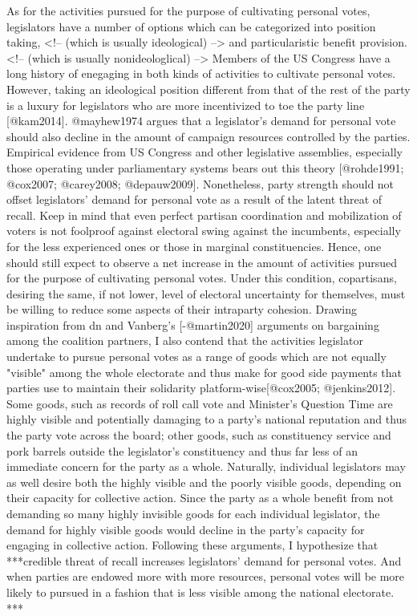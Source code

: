 \documentclass[hyphens, crop=false]{standalone}
\begin{document}
		As for the activities pursued for the purpose of cultivating personal votes,
		legislators have a number of options which can be categorized into position taking,
		<!-- (which is usually ideological) --> and particularistic benefit provision.
		<!-- (which is usually nonideologlical) --> Members of the US Congress have a long history of enegaging in both kinds of activities to cultivate personal votes.
		However,
		taking an ideological position different from that of the rest of the party is a luxury for legislators who are more incentivized to toe the party line [@kam2014].
		@mayhew1974 argues that a legislator's demand for personal vote should also decline in the amount of campaign resources controlled by the parties.
		Empirical evidence from US Congress and other legislative assemblies,
		especially those operating under parliamentary systems bears out this theory [@rohde1991; @cox2007; @carey2008; @depauw2009].
		Nonetheless,
		party strength should not offset legislators' demand for personal vote as a result of the latent threat of recall.
		Keep in mind that even perfect partisan coordination and mobilization of voters is not foolproof against electoral swing against the incumbents,
		especially for the less experienced ones or those in marginal constituencies.
		Hence,
		one should still expect to observe a net increase in the amount of activities pursued for the purpose of cultivating personal votes.
		Under this condition,
		copartisans,
		desiring the same,
		if not lower,
		level of electoral uncertainty for themselves,
		must be willing to reduce some aspects of their intraparty cohesion.
		Drawing inspiration from dn and Vanberg's [-@martin2020] arguments on bargaining among the coalition partners,
		I also contend that the activities legislator undertake to pursue personal votes as a range of goods which are not equally "visible" among the whole electorate and thus make for good side payments that parties use to maintain their solidarity platform-wise[@cox2005; @jenkins2012].
		Some goods,
		such as records of roll call vote and Minister's Question Time are highly visible and potentially damaging to a party's national reputation and thus the party vote across the board; other goods,
		such as constituency service and pork barrels outside the legislator's constituency and thus far less of an immediate concern for the party as a whole.
		Naturally,
		individual legislators may as well desire both the highly visible and the poorly visible goods,
		depending on their capacity for collective action.
		Since the party as a whole benefit from not demanding so many highly invisible goods for each individual legislator,
		the demand for highly visible goods would decline in the party's capacity for engaging in collective action.
		Following these arguments,
		I hypothesize that ***credible threat of recall increases legislators' demand for personal votes.
		And when parties are endowed more with more resources,
		personal votes will be more likely to pursued in a fashion that is less visible among the national electorate.
		***
	
	
	
	
\end{document}
